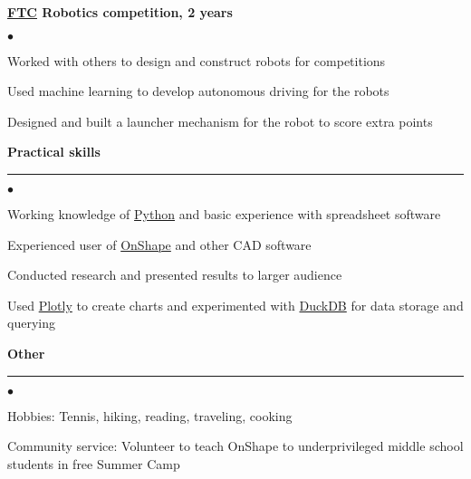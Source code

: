\documentclass[11pt]{article}
\begin{document}
\noindent
{\bf \href{https://www.firstinspires.org/robotics/ftc}{FTC} Robotics competition, 2 years} 
\begin{list}{$\bullet$}
   {\setlength{\itemsep}{0ex} \setlength{\parsep}{1ex}}
  \item Worked with others to design and construct robots for competitions
  \item Used machine learning to develop autonomous driving for the robots
  \item Designed and built a launcher mechanism for the robot to score extra points
\end{list}


\noindent
\large\textsf{\textbf {Practical skills}}

\vspace*{-8pt}
\noindent
\rule{165mm}{0.25mm}
\normalfont\normalsize

\vspace*{-4pt}
\begin{list}{$\bullet$}
   {\setlength{\itemsep}{0ex}
     \setlength{\parsep}{1ex}}
  \item Working knowledge of \href{https://www.python.org/}{Python} and basic experience with spreadsheet software
  \item Experienced user of \href{https://www.onshape.com}{OnShape} and other CAD software
  \item Conducted research and presented results to larger audience
  \item Used \href{https://plotly.com/graphing-libraries/}{Plotly} to create charts 
    and experimented with \href{https://duckdb.org/}{DuckDB} for data storage and querying        
\end{list}


\noindent
\large\textsf{\textbf {Other}}

\vspace*{-8pt}
\noindent
\rule{165mm}{0.25mm}
\normalfont\normalsize
\vspace*{-12pt}
\begin{list}{$\bullet$}
   {\setlength{\itemsep}{0ex}
    \setlength{\parsep}{1ex}} 
    \item Hobbies: Tennis, hiking, reading, traveling, cooking
    \item Community service: Volunteer to teach OnShape to underprivileged 
      middle school students in free Summer Camp
\end{list}
\end{document}
